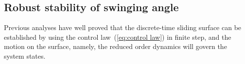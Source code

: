 \documentclass[10pt,final,journal]{IEEEtran}
\newcommand\sgn{{\rm sgn}}
\begin{document}
	\subsection{Robust stability of swinging angle}\label{subsec:rssa}
	Previous analyses have well proved that the discrete-time sliding surface can be established by using the control law~(\ref{eq:control law}) in finite step, and the motion on the surface, namely, the reduced order  dynamics will govern the system states. 
	
\end{document}
